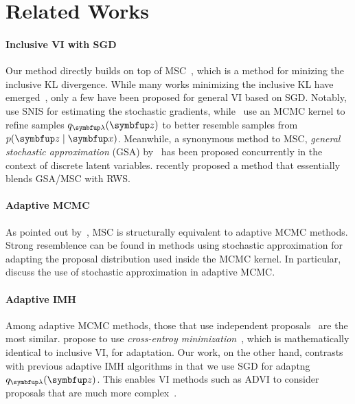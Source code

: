 
\section{Related Works}\label{section:related}
\paragraph{Inclusive VI with SGD}
Our method directly builds on top of MSC~\citep{NEURIPS2020_b2070693}, which is a method for minizing the inclusive KL divergence.
While many works minimizing the inclusive KL have emerged~\citep{DBLP:journals/corr/BornscheinB14, li_approximate_2017, 10.5555/2074022.2074067, pmlr-v124-ou20a, kim2021adaptive}, only a few have been proposed for general VI based on SGD.
Notably,~\citet{DBLP:journals/corr/BornscheinB14} use SNIS for estimating the stochastic gradients, while~\citet{li_approximate_2017} use an MCMC kernel to refine samples \(q_{\vlambda}(\vz)\) to better resemble samples from \(p(\vz\mid\vx)\).
Meanwhile, a synonymous method to MSC, \textit{general stochastic approximation} (GSA) by~\citet[Algorithm 1]{pmlr-v124-ou20a} has been proposed concurrently in the context of discrete latent variables.
\citet{kim2021adaptive} recently proposed a method that essentially blends GSA/MSC with RWS.

\vspace{-0.1in}
\paragraph{Adaptive MCMC}
As pointed out by~\citet{pmlr-v124-ou20a}, MSC is structurally equivalent to adaptive MCMC methods.
Strong resemblence can be found in methods using stochastic approximation for adapting the proposal distribution used inside the MCMC kernel.
In particular,~\citet{10.1007/s11222-008-9110-y, garthwaite_adaptive_2016} discuss the use of stochastic approximation in adaptive MCMC.

\vspace{-0.1in}
\paragraph{Adaptive IMH}
Among adaptive MCMC methods, those that use independent proposals~\citep{andrieu_ergodicity_2006, keith_adaptive_2008, holden_adaptive_2009, giordani_adaptive_2010} are the most similar.
\citet{keith_adaptive_2008} propose to use \textit{cross-entroy minimization}~\citet{barbakh_cross_2009}, which is mathematically identical to inclusive VI, for adaptation.
Our work, on the other hand, contrasts with previous adaptive IMH algorithms in that we use SGD for adaptng \(q_{\vlambda}(\vz)\).
This enables VI methods such as ADVI to consider proposals that are much more complex~\citep{JMLR:v18:16-107}.

